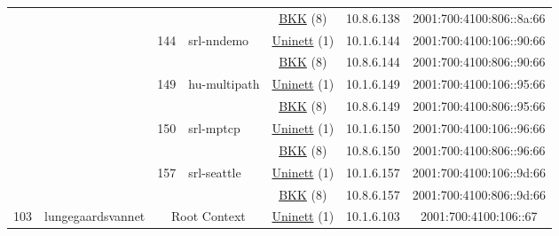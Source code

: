\begin{small}
\begin{center}
\begin{longtable}{|c|c|c|c|c|c|c|c|}
  &  &  &  & \multicolumn{2}{|c|}{\tiny{\href{http://bkk.no}{BKK} (8)}} & \tiny{10.8.6.138} & \tiny{2001:700:4100:806::8a:66} \\* \cline{3-3}\cline{4-4}\cline{5-5}\cline{6-6}\cline{7-7}\cline{8-8}
  &  & \multirow{2}{*}{\tiny{144}} & \multicolumn{1}{|l|}{\multirow{2}{*}{\tiny{srl-nndemo}}} & \multicolumn{2}{|c|}{\tiny{\href{https://www.uninett.no}{Uninett} (1)}} & \tiny{10.1.6.144} & \tiny{2001:700:4100:106::90:66} \\* \cline{5-5}\cline{6-6}\cline{7-7}\cline{8-8}
  &  &  &  & \multicolumn{2}{|c|}{\tiny{\href{http://bkk.no}{BKK} (8)}} & \tiny{10.8.6.144} & \tiny{2001:700:4100:806::90:66} \\* \cline{3-3}\cline{4-4}\cline{5-5}\cline{6-6}\cline{7-7}\cline{8-8}
  &  & \multirow{2}{*}{\tiny{149}} & \multicolumn{1}{|l|}{\multirow{2}{*}{\tiny{hu-multipath}}} & \multicolumn{2}{|c|}{\tiny{\href{https://www.uninett.no}{Uninett} (1)}} & \tiny{10.1.6.149} & \tiny{2001:700:4100:106::95:66} \\* \cline{5-5}\cline{6-6}\cline{7-7}\cline{8-8}
  &  &  &  & \multicolumn{2}{|c|}{\tiny{\href{http://bkk.no}{BKK} (8)}} & \tiny{10.8.6.149} & \tiny{2001:700:4100:806::95:66} \\* \cline{3-3}\cline{4-4}\cline{5-5}\cline{6-6}\cline{7-7}\cline{8-8}
  &  & \multirow{2}{*}{\tiny{150}} & \multicolumn{1}{|l|}{\multirow{2}{*}{\tiny{srl-mptcp}}} & \multicolumn{2}{|c|}{\tiny{\href{https://www.uninett.no}{Uninett} (1)}} & \tiny{10.1.6.150} & \tiny{2001:700:4100:106::96:66} \\* \cline{5-5}\cline{6-6}\cline{7-7}\cline{8-8}
  &  &  &  & \multicolumn{2}{|c|}{\tiny{\href{http://bkk.no}{BKK} (8)}} & \tiny{10.8.6.150} & \tiny{2001:700:4100:806::96:66} \\* \cline{3-3}\cline{4-4}\cline{5-5}\cline{6-6}\cline{7-7}\cline{8-8}
  &  & \multirow{2}{*}{\tiny{157}} & \multicolumn{1}{|l|}{\multirow{2}{*}{\tiny{srl-seattle}}} & \multicolumn{2}{|c|}{\tiny{\href{https://www.uninett.no}{Uninett} (1)}} & \tiny{10.1.6.157} & \tiny{2001:700:4100:106::9d:66} \\* \cline{5-5}\cline{6-6}\cline{7-7}\cline{8-8}
  &  &  &  & \multicolumn{2}{|c|}{\tiny{\href{http://bkk.no}{BKK} (8)}} & \tiny{10.8.6.157} & \tiny{2001:700:4100:806::9d:66} \\ \hline
 \multirow{20}{*}{\tiny{103}} & \multicolumn{1}{|l|}{\multirow{20}{*}{\tiny{lungegaardsvannet}}} & \multicolumn{2}{|c|}{\multirow{2}{*}{\tiny{Root Context}}} & \multicolumn{2}{|c|}{\tiny{\href{https://www.uninett.no}{Uninett} (1)}} & \tiny{10.1.6.103} & \tiny{2001:700:4100:106::67} \\* \cline{5-5}\cline{6-6}\cline{7-7}\cline{8-8}

\end{longtable}
\end{center}
\end{small}
